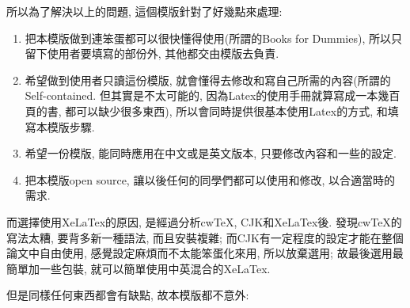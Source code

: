 
所以為了解決以上的問題, 這個模版針對了好幾點來處理:

\begin{enumerate}

  \item
  {
    把本模版做到連笨蛋都可以很快懂得使用(所謂的Books for Dummies), 所以只留下使用者要填寫的部份外, 其他都交由模版去負責.
  } %

  \item
  {
    希望做到使用者只讀這份模版, 就會懂得去修改和寫自己所需的內容(所謂的Self-contained. 但其實是不太可能的, 因為Latex的使用手冊就算寫成一本幾百頁的書, 都可以缺少很多東西), 所以會同時提供很基本使用Latex的方式, 和填寫本模版步驟.
  } %

  \item
  {
    希望一份模版, 能同時應用在中文或是英文版本, 只要修改內容和一些的設定.
  } %

  \item
  {
    把本模版open source, 讓以後任何的同學們都可以使用和修改, 以合適當時的需求.
  } %

\end{enumerate}

而選擇使用XeLaTex的原因, 是經過分析cwTeX, CJK和XeLaTex後. 發現cwTeX的寫法太糟, 要背多新一種語法, 而且安裝複雜; 而CJK有一定程度的設定才能在整個論文中自由使用, 感覺設定麻煩而不太能笨蛋化來用, 所以放棄選用; 故最後選用最簡單加一些包裝, 就可以簡單使用中英混合的XeLaTex.


但是同樣任何東西都會有缺點, 故本模版都不意外:

